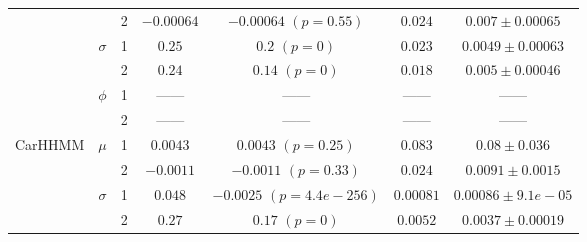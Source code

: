 \documentclass{article}
\begin{document}
\begin{center}
{\begin{tabular}{ccccccc}
                                    &                               & 2                                & $-0.00064$                         & $-0.00064$ $(p=0.55)$          & $0.024$                             & $0.007 \pm 0.00065$                             \\
                                    & \multirow{2}{*}{$\sigma$}     & 1                                & $0.25$                         & $0.2$ $(p=0)$          & $0.023$                             & $0.0049 \pm 0.00063$                             \\
                                    &                               & 2                                & $0.24$                         & $0.14$ $(p=0)$          & $0.018$                             & $0.005 \pm 0.00046$                             \\ 
                                    & \multirow{2}{*}{$\phi$}       & 1                                & ------                         & ------                     & ------                             & ------                                      \\
                                    &                               & 2                                & ------                         & ------                     & ------                             & ------                                      \\ \hline
        \multirow{6}{*}{CarHHMM}    & \multirow{2}{*}{$\mu$}        & 1                                & $0.0043$                         & $0.0043$ $(p=0.25)$          & $0.083$                             & $0.08 \pm 0.036$                             \\
                                    &                               & 2                                & $-0.0011$                         & $-0.0011$ $(p=0.33)$          & $0.024$                             & $0.0091 \pm 0.0015$                             \\
                                    & \multirow{2}{*}{$\sigma$}     & 1                                & $0.048$                         & $-0.0025$ $(p=4.4e-256)$          & $0.00081$                             & $0.00086 \pm 9.1e-05$                             \\
                                    &                               & 2                                & $0.27$                         & $0.17$ $(p=0)$          & $0.0052$                             & $0.0037 \pm 0.00019$                             \\ 

\end{tabular}}
\end{center}
\end{document}
